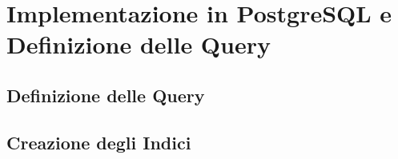 \section{Implementazione in PostgreSQL e Definizione
delle Query}

\subsection{Definizione delle Query}

\subsection{Creazione degli Indici}